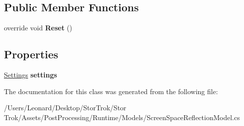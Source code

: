 \subsection*{Public Member Functions}
\begin{DoxyCompactItemize}
\item 
\mbox{\label{class_unity_engine_1_1_post_processing_1_1_screen_space_reflection_model_abf314aab69e370e9f092e17e69a57066}} 
override void {\bfseries Reset} ()
\end{DoxyCompactItemize}
\subsection*{Properties}
\begin{DoxyCompactItemize}
\item 
\mbox{\label{class_unity_engine_1_1_post_processing_1_1_screen_space_reflection_model_a8d261a46d42d443edb5cc23d9e8bdfb7}} 
\hyperlink{struct_unity_engine_1_1_post_processing_1_1_screen_space_reflection_model_1_1_settings}{Settings} {\bfseries settings}
\end{DoxyCompactItemize}


The documentation for this class was generated from the following file\+:\begin{DoxyCompactItemize}
\item 
/\+Users/\+Leonard/\+Desktop/\+Stor\+Trok/\+Stor Trok/\+Assets/\+Post\+Processing/\+Runtime/\+Models/Screen\+Space\+Reflection\+Model.\+cs\end{DoxyCompactItemize}

